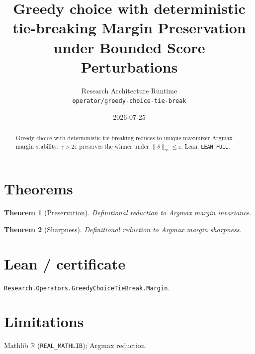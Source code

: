 \documentclass[11pt]{article}
\title{Greedy choice with deterministic tie-breaking Margin Preservation under Bounded Score Perturbations}
\author{Research Architecture Runtime \\ \texttt{operator/greedy-choice-tie-break}}
\date{2026-07-25}
\newtheorem{theorem}{Theorem}
\begin{document}
\maketitle
\begin{abstract}
Greedy choice with deterministic tie-breaking reduces to unique-maximizer Argmax margin stability: $\gamma>2\varepsilon$
preserves the winner under $\|\delta\|_\infty\le\varepsilon$. Lean: \texttt{LEAN\_FULL}.
\end{abstract}
\section{Theorems}
\begin{theorem}[Preservation]
Definitional reduction to Argmax margin invariance.
\end{theorem}
\begin{theorem}[Sharpness]
Definitional reduction to Argmax margin sharpness.
\end{theorem}
\section{Lean / certificate}
\texttt{Research.Operators.GreedyChoiceTieBreak.Margin}.
\section{Limitations}
Mathlib $\mathbb{R}$ (\texttt{REAL\_MATHLIB}); Argmax reduction.
\end{document}
